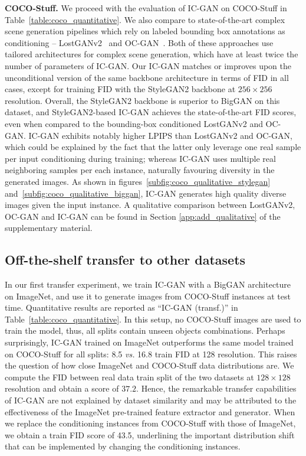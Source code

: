 \textbf{COCO-Stuff.}
We proceed with the evaluation of {IC-GAN} on COCO-Stuff in Table~\ref{table:coco_quantitative}. We also compare  to state-of-the-art complex scene generation pipelines which rely on labeled bounding box annotations as conditioning -- LostGANv2~\cite{sun2020learning} and OC-GAN~\cite{sylvain2020object}. Both of these approaches use tailored architectures for complex scene generation, which have at least twice the number of parameters of {IC-GAN}. Our {IC-GAN} matches or improves upon the unconditional version of the same backbone architecture in terms of FID in all cases, except for training FID with the StyleGAN2 backbone at $256\!\times\!256$ resolution. Overall, the StyleGAN2 backbone is superior to BigGAN on this dataset, and StyleGAN2-based {IC-GAN} achieves the state-of-the-art FID scores, even when compared to the bounding-box conditioned LostGANv2 and OC-GAN. {IC-GAN} exhibits notably higher LPIPS than LostGANv2 and OC-GAN, which  could be explained by the fact that  the latter   only leverage one real sample per input conditioning during  training; whereas {IC-GAN} uses multiple real neighboring samples per each instance, naturally favouring diversity in the generated images. As shown in figures~\ref{subfig:coco_qualitative_stylegan} and~\ref{subfig:coco_qualitative_biggan}, {IC-GAN} generates high quality diverse images given the input instance. A qualitative comparison between LostGANv2, OC-GAN and {IC-GAN} can be found in Section \ref{app:add_qualitative} of the supplementary material.

\subsection{Off-the-shelf transfer to other datasets}
\label{sec:transfer}
In our first transfer experiment, we train {IC-GAN}  with a BigGAN architecture on ImageNet, and use it to generate images from COCO-Stuff instances at  test time. Quantitative results are reported as ``{IC-GAN} (transf.)'' in Table~\ref{table:coco_quantitative}. 
In this setup, no COCO-Stuff images  are used to train  the model, thus, all splits contain unseen objects combinations. Perhaps surprisingly, {IC-GAN} trained on ImageNet  outperforms the same model trained on COCO-Stuff for all splits: 8.5 \textit{vs.} 16.8 train FID at 128 resolution. This  raises the question of how close ImageNet and COCO-Stuff data distributions are. We compute the FID between real data train split of the two datasets at $128\!\times\!128$ resolution and obtain a score of $37.2$. Hence, the remarkable transfer capabilities of {IC-GAN} are not explained by  dataset similarity and may be attributed to the effectiveness of the ImageNet pre-trained  feature extractor and generator. When we replace the conditioning instances from COCO-Stuff with those of ImageNet, we obtain a train FID score of 43.5, underlining the important distribution shift that can be implemented by changing the conditioning instances. 

